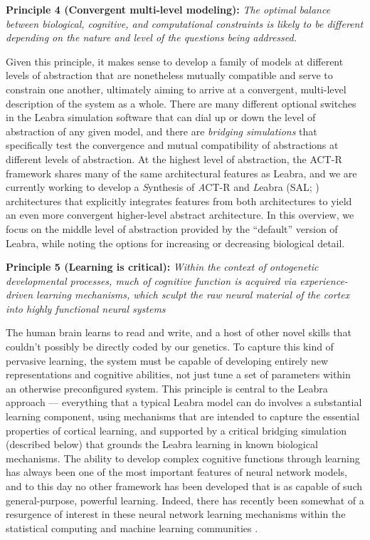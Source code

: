 \documentclass[11pt,twoside]{article}
\begin{document}
{\bf Principle 4 (Convergent multi-level modeling):} {\em The optimal balance
  between biological, cognitive, and computational constraints is likely to be
  different depending on the nature and level of the questions being
  addressed.}  

Given this principle, it makes sense to develop a family of models at
different levels of abstraction that are nonetheless mutually compatible and
serve to constrain one another, ultimately aiming to arrive at a convergent,
multi-level description of the system as a whole.  There are many different
optional switches in the Leabra simulation software that can dial up or down
the level of abstraction of any given model, and there are {\em bridging
  simulations} that specifically test the convergence and mutual compatibility
of abstractions at different levels of abstraction.  At the highest level of
abstraction, the ACT-R framework shares many of the same architectural
features as Leabra, and we are currently working to develop a {\em S}ynthesis
of {\em A}CT-R and {\em L}eabra (SAL; )
architectures that explicitly integrates features from both architectures to
yield an even more convergent higher-level abstract architecture.  In this
overview, we focus on the middle level of abstraction provided by the
``default'' version of Leabra, while noting the options for increasing or
decreasing biological detail.

{\bf Principle 5 (Learning is critical):} {\em Within the context of
  ontogenetic developmental processes, much of cognitive function is acquired
  via experience-driven learning mechanisms, which sculpt the raw neural
  material of the cortex into highly functional neural systems}

The human brain learns to read and write, and a host of other novel skills
that couldn't possibly be directly coded by our genetics.  To capture this
kind of pervasive learning, the system must be capable of developing entirely
new representations and cognitive abilities, not just tune a set of parameters
within an otherwise preconfigured system.  This principle is central to the
Leabra approach --- everything that a typical Leabra model can do involves a
substantial learning component, using mechanisms that are intended to capture
the essential properties of cortical learning, and supported by a critical
bridging simulation (described below) that grounds the Leabra learning in
known biological mechanisms.  The ability to develop complex cognitive
functions through learning has always been one of the most important features
of neural network models, and to this day no other framework has been
developed that is as capable of such general-purpose, powerful learning.
Indeed, there has recently been somewhat of a resurgence of interest in these
neural network learning mechanisms within the statistical computing and
machine learning communities \cite{HintonSalakhutdinov06,CiresanMeierGambardellaEtAl10,KollerFriedman09}.  
\end{document}
